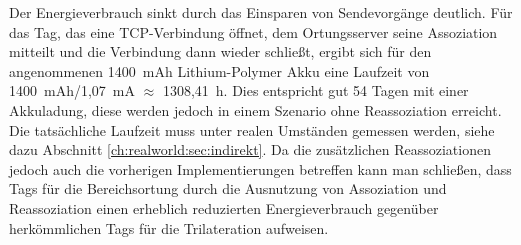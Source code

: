 Der Energieverbrauch sinkt durch das Einsparen von Sendevorgänge deutlich.
Für das Tag, das eine TCP-Verbindung öffnet, dem Ortungsserver seine Assoziation mitteilt und die Verbindung dann wieder schließt, ergibt sich für den angenommenen 1400\ mAh Lithium-Polymer Akku eine Laufzeit von 1400\ mAh/1,07\ mA $\approx$ 1308,41\ h. 
Dies entspricht gut 54 Tagen mit einer Akkuladung, diese werden jedoch in einem Szenario ohne Reassoziation erreicht.
Die tatsächliche Laufzeit muss unter realen Umständen gemessen werden, siehe dazu Abschnitt \ref{ch:realworld:sec:indirekt}.
Da die zusätzlichen Reassoziationen jedoch auch die vorherigen Implementierungen betreffen kann man schließen, dass Tags für die Bereichsortung durch die Ausnutzung von Assoziation und Reassoziation einen erheblich reduzierten Energieverbrauch gegenüber herkömmlichen Tags für die Trilateration aufweisen.




